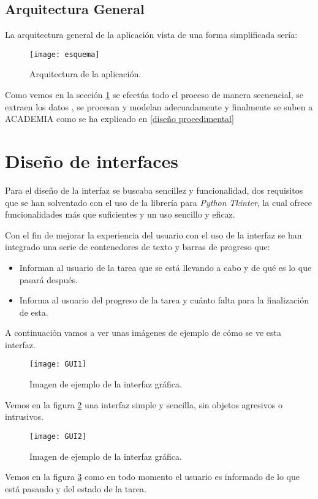 \subsection{Arquitectura General}
La arquitectura general de la aplicación vista de una forma simplificada sería:
\begin{figure}[H]
	\centering
	\texttt{[image: esquema]}
	\caption{Arquitectura de la aplicación.}
	\label{fig:esquema}
\end{figure}
Como vemos en la sección \ref{fig:esquema} se efectúa todo el proceso de manera secuencial, se extraen los datos , se procesan y modelan adecuadamente y finalmente se suben a ACADEMIA como se ha explicado en \ref{diseño procedimental}
\section{Diseño de interfaces}
Para el diseño de la interfaz se buscaba sencillez y funcionalidad, dos requisitos que se han solventado con el uso de la librería para \emph{Python} \emph{Tkinter}, la cual ofrece funcionalidades más que suficientes y un uso sencillo y eficaz.

Con el fin de mejorar la experiencia del usuario con el uso de la interfaz se han integrado una serie de contenedores de texto y barras de progreso que: 
\begin{itemize}
	\item Informan al usuario de la tarea que se está llevando a cabo y de qué es lo que pasará después.
	\item Informa al usuario del progreso de la tarea y cuánto falta para la finalización de esta.
\end{itemize}

A continuación vamos a ver unas imágenes de ejemplo de cómo se ve esta interfaz.
\begin{figure}[H]
	\centering
	\texttt{[image: GUI1]}
	\caption{Imagen de ejemplo de la interfaz gráfica.}
	\label{fig:gui1}
\end{figure}
Vemos en la figura \ref{fig:gui1} una interfaz simple y sencilla, sin objetos agresivos o intrusivos.
\begin{figure}[H]
	\centering
	\texttt{[image: GUI2]}
	\caption{Imagen de ejemplo de la interfaz gráfica.}
	\label{fig:gui2}
\end{figure}

Vemos en la figura \ref{fig:gui2} como en todo momento el usuario es informado de lo que está pasando y del estado de la tarea.

